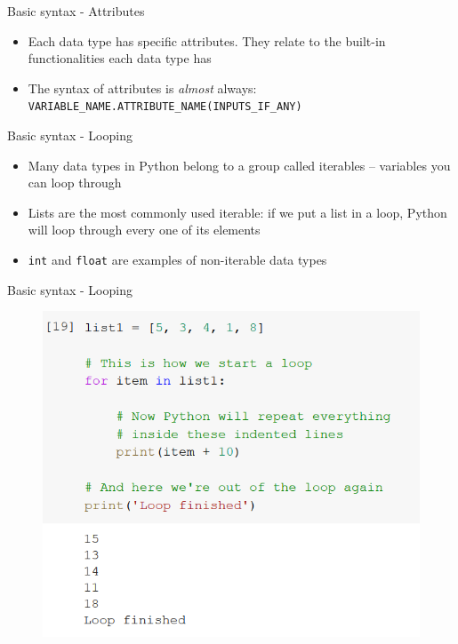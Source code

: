 \documentclass[aspectratio=169]{beamer}
\begin{document}
\begin{frame}{Basic syntax - Attributes}

	\begin{itemize}
		\item Each data type has specific attributes. They relate to the built-in functionalities each data type has
		\item The syntax of attributes is \textit{almost} always: \texttt{VARIABLE\_NAME.ATTRIBUTE\_NAME(INPUTS\_IF\_ANY)}
	\end{itemize}

\end{frame}

\begin{frame}{Basic syntax - Looping}

	\begin{itemize}
		\item Many data types in Python belong to a group called iterables -- variables you can loop through
		\item Lists are the most commonly used iterable: if we put a list in a loop, Python will loop through every one of its elements
		\item \texttt{int} and \texttt{float} are examples of non-iterable data types
	\end{itemize}

\end{frame}

\begin{frame}{Basic syntax - Looping}

	\begin{figure}
		\centering
		\includegraphics[width=0.6\linewidth]{img/list_loop.png}
	\end{figure}

\end{frame}
\end{document}
